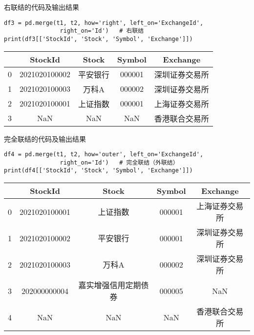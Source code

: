 \documentclass[t]{beamer}
\begin{document}
  \begin{frame}[fragile]{右联结的代码及输出结果}
    \begin{lstlisting}
df3 = pd.merge(t1, t2, how='right', left_on='ExchangeId',
                right_on='Id')   # 右联结
print(df3[['StockId', 'Stock', 'Symbol', 'Exchange']])               
    \end{lstlisting}
    \begin{center}
      \begin{tabular}{ccccc}
        \hline
       & StockId& Stock & Symbol& Exchange\\
       \hline
       0 & 2021020100002&  平安银行 & 000001&  深圳证券交易所\\
       1  &2021020100003 &  万科A & 000002 & 深圳证券交易所\\
       2 & 2021020100001  &上证指数&  000001&  上海证券交易所\\
       3  &          NaN   &NaN&     NaN&  香港联合交易所\\
        \hline
      \end{tabular}
    \end{center}
    \end{frame}

  \begin{frame}[fragile]{完全联结的代码及输出结果}
    \begin{lstlisting}
df4 = pd.merge(t1, t2, how='outer', left_on='ExchangeId',
                right_on='Id')   # 完全联结（外联结）
print(df4[['StockId', 'Stock', 'Symbol', 'Exchange']])               
    \end{lstlisting}
    \normalsize
    \begin{center}
      \begin{tabular}{ccccc}
        \hline
       & StockId& Stock & Symbol& Exchange\\
       \hline
      0&  2021020100001&  上证指数 & 000001 & 上海证券交易所\\
      1 & 2021020100002 & 平安银行  &000001&  深圳证券交易所\\
      2  &2021020100003  & 万科A  &000002&  深圳证券交易所\\
      3 &  202000000004 & 嘉实增强信用定期债券 & 000005 &     NaN\\
      4 &          NaN   &NaN&     NaN&  香港联合交易所\\
        \hline
      \end{tabular}
    \end{center}
    \end{frame}
\end{document}
